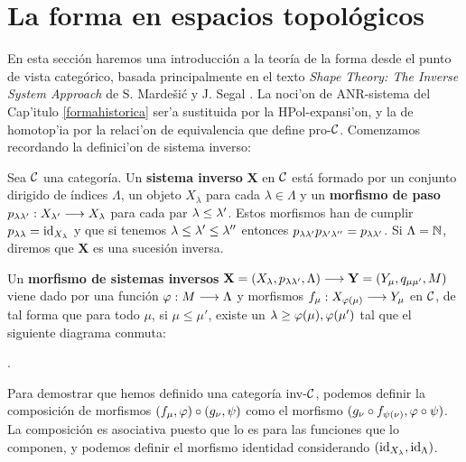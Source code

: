 \chapter{La forma en espacios topológicos}\label{formacategorica}
En esta sección haremos una introducción a la teoría de la forma desde el punto de vista categórico, basada principalmente en el texto \textit{Shape Theory: The Inverse System Approach} de S. Marde\v si\' c y J. Segal \cite{mardešić1982shape}. La noci'on de ANR-sistema del Cap'itulo \ref{formahistorica} ser'a sustituida por la HPol-expansi'on, y la de homotop'ia por la relaci'on de equivalencia que define pro-$\mathcal{C}$. Comenzamos recordando la definici'on de sistema inverso:
\begin{definition}
  Sea $ \mathcal{C}  $ una categoría. Un \textbf{sistema inverso} $ \mathbf{X } $ en $ \mathcal{C}  $ está formado por un conjunto dirigido de índices $ \Lambda  $, un objeto $ X_\lambda  $ para cada $ \lambda \in \Lambda  $ y un \textbf{morfismo de paso} $ p_{\lambda \lambda' } : X_{\lambda'} \longrightarrow X_\lambda $ para cada par $ \lambda\leq \lambda'  $. Estos morfismos han de cumplir $ p_{\lambda \lambda }  = \operatorname{id}_{X_\lambda } $ y que si tenemos $ \lambda\leq \lambda' \leq \lambda''  $ entonces $ p_{\lambda \lambda'}p_{\lambda'\lambda ''} = p_{\lambda \lambda' } $. Si $ \Lambda  = \mathbb{N}  $, diremos que $ \mathbf{X } $ es una sucesión inversa.
\end{definition}
\begin{definition}
  Un \textbf{morfismo de sistemas inversos} $ \mathbf{X} = (X_\lambda,p_{\lambda\lambda' },\Lambda)\longrightarrow \mathbf{Y} = (Y_\mu ,q_{\mu\mu' },M ) $ viene dado por una función $ \varphi:M\longrightarrow \Lambda  $ y morfismos $ f_\mu:X_{\varphi(\mu)}\longrightarrow Y_\mu  $ en $ \mathcal{C}  $, de tal forma que para todo $ \mu $, si $ \mu\leq \mu'  $, existe un $ \lambda\geq \varphi(\mu),\varphi(\mu' ) $ tal que el siguiente diagrama conmuta:
  \begin{center}
    .
  \end{center}
\end{definition}
Para demostrar que hemos definido una categoría inv-$ \mathcal{C}  $, podemos definir la composición de morfismos $ (f_\mu,\varphi)\circ (g_\nu,\psi ) $ como el morfismo $ (g_\nu\circ f_{\psi(\nu )},\varphi\circ \psi ) $. La composición es asociativa puesto que lo es para las funciones que lo componen, y podemos definir el morfismo identidad considerando $ (\operatorname{id}_{X_\lambda}, \operatorname{id}_{\Lambda }) $.

